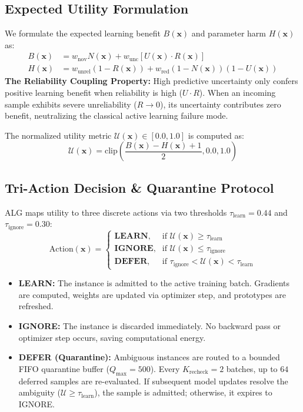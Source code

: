 \documentclass[journal,10pt,twocolumn]{article}
\begin{document}
\subsection{Expected Utility Formulation}
We formulate the expected learning benefit $B(\mathbf{x})$ and parameter harm $H(\mathbf{x})$ as:
\begin{align}
B(\mathbf{x}) &= w_{\text{nov}} N(\mathbf{x}) + w_{\text{unc}} \left[ U(\mathbf{x}) \cdot R(\mathbf{x}) \right] \\
H(\mathbf{x}) &= w_{\text{unrel}} (1 - R(\mathbf{x})) + w_{\text{red}} (1 - N(\mathbf{x}))(1 - U(\mathbf{x}))
\end{align}
\textbf{The Reliability Coupling Property:} High predictive uncertainty only confers positive learning benefit when reliability is high ($U \cdot R$). When an incoming sample exhibits severe unreliability ($R \to 0$), its uncertainty contributes zero benefit, neutralizing the classical active learning failure mode.

The normalized utility metric $\mathcal{U}(\mathbf{x}) \in [0.0, 1.0]$ is computed as:
\begin{equation}
\mathcal{U}(\mathbf{x}) = \text{clip}\left(\frac{B(\mathbf{x}) - H(\mathbf{x}) + 1}{2}, 0.0, 1.0\right)
\end{equation}

\subsection{Tri-Action Decision & Quarantine Protocol}
ALG maps utility to three discrete actions via two thresholds $\tau_{\text{learn}} = 0.44$ and $\tau_{\text{ignore}} = 0.30$:
\begin{equation}
\text{Action}(\mathbf{x}) = \begin{cases}
\textbf{LEARN}, & \text{if } \mathcal{U}(\mathbf{x}) \ge \tau_{\text{learn}} \\
\textbf{IGNORE}, & \text{if } \mathcal{U}(\mathbf{x}) \le \tau_{\text{ignore}} \\
\textbf{DEFER}, & \text{if } \tau_{\text{ignore}} < \mathcal{U}(\mathbf{x}) < \tau_{\text{learn}}
\end{cases}
\end{equation}

\begin{itemize}
    \item \textbf{LEARN:} The instance is admitted to the active training batch. Gradients are computed, weights are updated via optimizer step, and prototypes are refreshed.
    \item \textbf{IGNORE:} The instance is discarded immediately. No backward pass or optimizer step occurs, saving computational energy.
    \item \textbf{DEFER (Quarantine):} Ambiguous instances are routed to a bounded FIFO quarantine buffer ($Q_{\max} = 500$). Every $K_{\text{recheck}} = 2$ batches, up to $64$ deferred samples are re-evaluated. If subsequent model updates resolve the ambiguity ($\mathcal{U} \ge \tau_{\text{learn}}$), the sample is admitted; otherwise, it expires to IGNORE.
\end{itemize}
\end{document}

